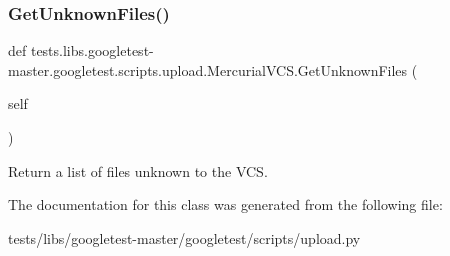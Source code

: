 \subsubsection{\texorpdfstring{Get\+Unknown\+Files()}{GetUnknownFiles()}}
{\footnotesize\ttfamily def tests.\+libs.\+googletest-\/master.\+googletest.\+scripts.\+upload.\+Mercurial\+V\+C\+S.\+Get\+Unknown\+Files (\begin{DoxyParamCaption}\item[{}]{self }\end{DoxyParamCaption})}

\begin{DoxyVerb}Return a list of files unknown to the VCS.\end{DoxyVerb}
 

The documentation for this class was generated from the following file\+:\begin{DoxyCompactItemize}
\item 
tests/libs/googletest-\/master/googletest/scripts/upload.\+py\end{DoxyCompactItemize}
